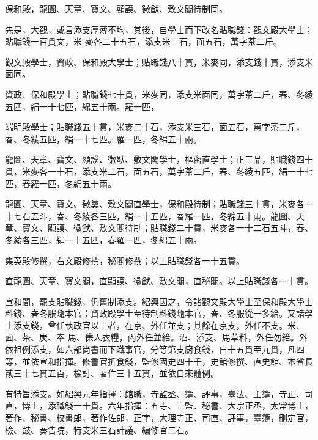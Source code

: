 \begin{pinyinscope}
 保和殿，龍圖、天章、寶文、顯謨、徽猷、敷文閣待制同。



 先是，大觀，或言添支厚薄不均，其後，自學士而下改名貼職錢：觀文殿大學士；貼職錢一百貫文，米
 麥各二十五石，添支米三石，面五石，萬字茶二斤。



 觀文殿學士，資政、保和殿大學士；貼職錢八十貫，米麥同，添支錢十貫，添支米面同。



 資政、保和殿學士；貼職錢七十貫，米麥同，添支米面同，萬字茶二斤，春、冬綾五匹，絹一十七匹，綿五十兩。羅一匹，



 端明殿學士；貼職錢五十貫，米麥二十石，添支米三石，面五石，萬字茶二斤，春、冬綾五匹，絹一十七匹。羅一匹，冬綿五十兩。



 龍圖、天章、寶文、顯謨、徽猷、敷文閣學士，樞密直學士；正三品，貼職錢四十貫，米麥各一十石，添支米二石，面五石，萬字茶二斤，春、冬綾五匹，絹一十七匹，春羅一匹，冬綿五十兩。



 龍圖、天章、寶文、徽奠、敷文閣直學士，保和殿待制；貼職錢三十貫，米麥各一十七石五斗，春、冬綾各三匹，絹一十五匹，春羅一匹，冬綿五十兩。龍圖、天
 章、寶文、顯謨、徽猷、敷文閣待制；貼職錢二十貫，米麥各一十二石五斗，春、冬綾各三匹，絹一十五匹，春羅一匹，冬綿五十兩。



 集英殿修撰，右文殿修撰，秘閣修撰；以上貼職錢各一十五貫。



 直龍圖、天章、寶文閣，直顯謨、徽猷、敷文閣，直秘閣。以上貼職錢各一十貫。



 宣和間，罷支貼職錢，仍舊制添支。紹興因之，令諸觀文殿大學士至保和殿大學士料錢、春冬服隨本官；資政殿學士至待制料錢隨本官，春、冬服從一多給。又諸學士添支錢，曾任執政官以上者，在京、外任並支；其餘在京支，外任不支。米、面、茶、炭、奉
 馬、傔人衣糧，內外任並給。酒、添支、馬草料，外任勿給。外依祖例添支，如六部尚書而下職事官，分等第支廚食錢，自十五貫至九貫，凡四等，並依宣和指揮。修書官折食錢，監修國史四十千，史館修撰、直史館、本省長貳三十七貫五百，檢討、著作三十五貫，並依自來體例。



 有特旨添支。如紹興元年指揮：館職，寺監丞、簿、評事，臺法、主簿，寺正、司直，博士，添職錢一十貫。六年指揮：五寺、三監、秘書、大宗正丞，太常博士，著作、秘書、校書郎，著作佐郎，正字，大理寺正、司直、評事，臺簿，刪定官，檢、鼓、奏告院，特支米三石計議、編修官二石。




\end{pinyinscope}
